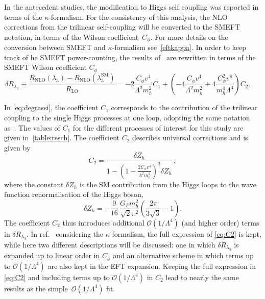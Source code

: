 	\par In the antecedent studies, the modification to Higgs self coupling was reported in terms of the $\kappa$-formalism. For the consistency of this analysis, the NLO corrections from the trilinear self-coupling will be converted to the SMEFT notation, in terms of the Wilson coefficient~$C_\phi$. For more details on the conversion between SMEFT and $\kappa$-formalism see~\autoref{eftkappa}. In order to keep track of he SMEFT power-counting, the results of~\cite{Degrassi:2016wml} are rewritten in terms of the SMEFT Wilson coefficient $C_\phi$
	\begin{equation}
		\delta R_{\lambda_3}\equiv\frac{R_\mathrm{ NLO}(\lambda_3)-R_\mathrm{ NLO}(\lambda_3^\mathrm{{SM}})}{R_\mathrm{ LO}}=-2\frac{C_{\phi}v^4}{\Lambda^2 m_h^2}C_1 + \left(-4\frac{C_{\phi}v^4}{\Lambda^2 m_h^2}+4\frac{C_{\phi}^2 v^8}{m_h^4\Lambda^4}\right) C_2 . \;\;\;\;\;
		\label{eq:degrassi}
	\end{equation}
\par 	In \eqref{eq:degrassi}, the coefficient $C_1$ corresponds to the contribution of the trilinear coupling to the single Higgs processes at one loop, adopting the same notation as~\cite{Degrassi:2016wml}. The values of $C_1$ for the different processes of interest for this study are given in~\autoref{table:resch}. The coefficient $C_2$ describes universal corrections and is given by
	\begin{equation}
		C_2=\frac{\delta Z_h}{1-\left(1-\frac{2 C_\phi v^4}{\Lambda^2 m_h^2}\right)^2 \delta Z_h}\,, \label{eq:C2}
	\end{equation}
	where the constant $\delta Z_h$ is the SM contribution from the Higgs loops to the wave function renormalisation of the Higgs boson,
	\begin{equation}
		\delta Z_h =-\frac{9}{16}\,\frac{G_F m_h^2}{\sqrt{2}\pi^2}\left(\frac{2\pi}{3\sqrt{3}}-1\right).
	\end{equation}
	The coefficient $C_2$ thus introduces additional $\mathcal{O}(1/\Lambda^4)$ (and higher order) terms in $\delta R_{\lambda_3}$.  
	In ref.~\cite{Degrassi:2016wml} considering the $\kappa$-formalism, the full expression of \eqref{eq:C2} is kept, while here two different descriptions will be discussed: one in which $\delta R_{\lambda_3}$ is expanded up to linear order in $C_\phi$ and an alternative scheme in which terms up to $\mathcal{O}(1/\Lambda^4)$ are also kept in the EFT expansion. Keeping the full expression in \eqref{eq:C2} and including terms up to $\mathcal{O}(1/\Lambda^4)$  in $C_2$ lead to nearly the same results as the simple~$\mathcal{O}(1/\Lambda^4)$ fit.

